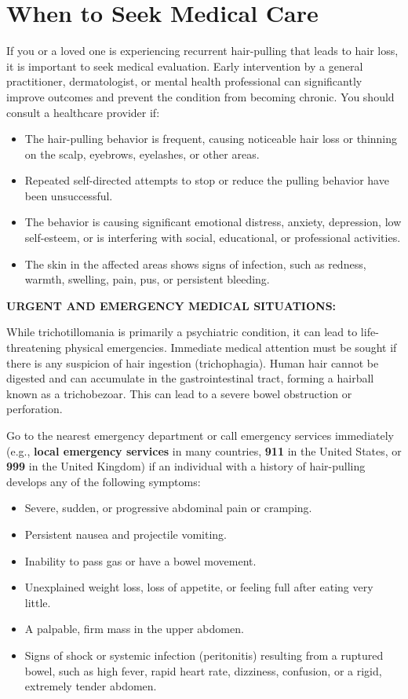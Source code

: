\section*{When to Seek Medical Care}
If you or a loved one is experiencing recurrent hair-pulling that leads to hair loss, it is important to seek medical evaluation. Early intervention by a general practitioner, dermatologist, or mental health professional can significantly improve outcomes and prevent the condition from becoming chronic. You should consult a healthcare provider if:
\begin{itemize}
    \item The hair-pulling behavior is frequent, causing noticeable hair loss or thinning on the scalp, eyebrows, eyelashes, or other areas.
    \item Repeated self-directed attempts to stop or reduce the pulling behavior have been unsuccessful.
    \item The behavior is causing significant emotional distress, anxiety, depression, low self-esteem, or is interfering with social, educational, or professional activities.
    \item The skin in the affected areas shows signs of infection, such as redness, warmth, swelling, pain, pus, or persistent bleeding.
\end{itemize}

\noindent \textbf{URGENT AND EMERGENCY MEDICAL SITUATIONS:}

\noindent While trichotillomania is primarily a psychiatric condition, it can lead to life-threatening physical emergencies. Immediate medical attention must be sought if there is any suspicion of hair ingestion (trichophagia). Human hair cannot be digested and can accumulate in the gastrointestinal tract, forming a hairball known as a trichobezoar. This can lead to a severe bowel obstruction or perforation.

Go to the nearest emergency department or call emergency services immediately (e.g., \textbf{local emergency services} in many countries, \textbf{911} in the United States, or \textbf{999} in the United Kingdom) if an individual with a history of hair-pulling develops any of the following symptoms:
\begin{itemize}
    \item Severe, sudden, or progressive abdominal pain or cramping.
    \item Persistent nausea and projectile vomiting.
    \item Inability to pass gas or have a bowel movement.
    \item Unexplained weight loss, loss of appetite, or feeling full after eating very little.
    \item A palpable, firm mass in the upper abdomen.
    \item Signs of shock or systemic infection (peritonitis) resulting from a ruptured bowel, such as high fever, rapid heart rate, dizziness, confusion, or a rigid, extremely tender abdomen.
\end{itemize}

